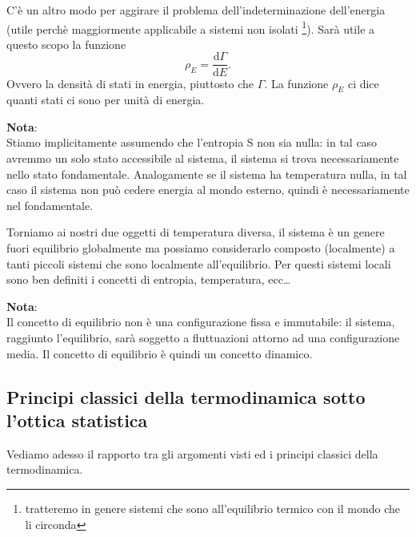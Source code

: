 C'è un altro modo per aggirare il problema dell'indeterminazione dell'energia (utile perchè maggiormente applicabile a sistemi non isolati \footnote{tratteremo in genere sistemi che sono all'equilibrio termico con il mondo che li circonda}).
Sarà utile a questo scopo la funzione 
\[
	\rho_{E} = \frac{\mbox{d} \Gamma}{\mbox{d} E} 
.\] 
Ovvero la densità di stati in energia, piuttosto che $\Gamma$. La funzione $\rho_{E}$ ci dice quanti stati ci sono per unità di energia.
\begin{framed}
\noindent \textbf{Nota}: \\
Stiamo implicitamente assumendo che l'entropia S non sia nulla: in tal caso avremmo un solo stato accessibile al sistema, il sistema si trova necessariamente nello stato fondamentale.
Analogamente se il sistema ha temperatura nulla, in tal caso il sistema non può cedere energia al mondo esterno, quindi è necessariamente nel fondamentale.
\end{framed}
\noindent 
Torniamo ai nostri due oggetti di temperatura diversa, il sistema è un genere fuori equilibrio globalmente ma possiamo considerarlo composto (localmente) a tanti piccoli sistemi che sono localmente all'equilibrio. Per questi sistemi locali sono ben definiti i concetti di entropia, temperatura, ecc\ldots
\begin{framed}
\noindent \textbf{Nota}: \\
Il concetto di equilibrio non è una configurazione fissa e immutabile: il sistema, raggiunto l'equilibrio, sarà soggetto a fluttuazioni attorno ad una configurazione media. Il concetto di equilibrio è quindi un concetto dinamico.
\end{framed}
\noindent 
\subsection{Principi classici della termodinamica sotto l'ottica statistica}
Vediamo adesso il rapporto tra gli argomenti visti ed i principi classici della termodinamica.
